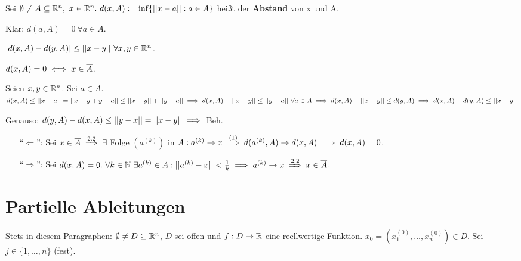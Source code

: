 \documentclass[a4paper,twoside,DIV15,BCOR12mm,chapterprefix=true,headings=twolinechapter]{scrbook}
\begin{document}
\begin{definition*}
Sei $\emptyset \ne A \subseteq \mathbb{R}^n,\ x \in \mathbb{R}^n.\ d(x,A) := \inf\{||x-a||:a \in A\}$ heißt der \textbf{Abstand} von x und A.

Klar: $d(a,A) = 0\ \forall a \in A$.
\end{definition*}

\begin{satz}
\begin{liste}
\item $|d(x,A) - d(y,A)| \le ||x-y||\ \forall x,y \in \mathbb{R}^n$.
\item $d(x,A) = 0 \iff x \in \overline{A}$.
\end{liste}
\end{satz}

\begin{beweise}
\item Seien $x,y \in \mathbb{R}^n$. Sei $a \in A$. $d(x,A) \le ||x-a|| = ||x-y+y-a|| \le ||x-y||+||y-a||\\
\implies d(x,A)-||x-y|| \le ||y-a||\ \forall a \in A\\
\implies d(x,A) - ||x-y|| \le d(y,A)\\
\implies d(x,A) - d(y,A) \le ||x-y||$

Genauso: $d(y,A) - d(x,A) \le ||y-x|| = ||x-y|| \implies$ Beh.
\item \begin{itemize}
\item["`$\Leftarrow$"':] Sei $x \in \overline{A} \folgtnach{2.2} \exists$ Folge $(a^{(k)})$ in $A: a^{(k)} \to x \folgtnach{(1)} d(a^{(k)},A) \to d(x,A) \folgt d(x,A) = 0$.
\item["`$\Rightarrow$"':] Sei $d(x,A) = 0.\ \forall k \in \MdN\ \exists a^{(k)} \in A: ||a^{(k)} - x|| < \frac{1}{k} \folgt a^{(k)} \to x \folgtnach{2.2} x \in \overline{A}$.
\end{itemize}
\end{beweise}



\chapter{Partielle Ableitungen}

Stets in diesem Paragraphen: $\emptyset\ne D\subseteq \mathbb{R}^n$, $D$ sei offen und $f:D\to\mathbb{R}$ eine reellwertige Funktion. $x_0 = (x_1^{(0)}, \ldots, x_n^{(0)}) \in D$. Sei $j\in\{1,\ldots,n\}$ (fest).
\end{document}

